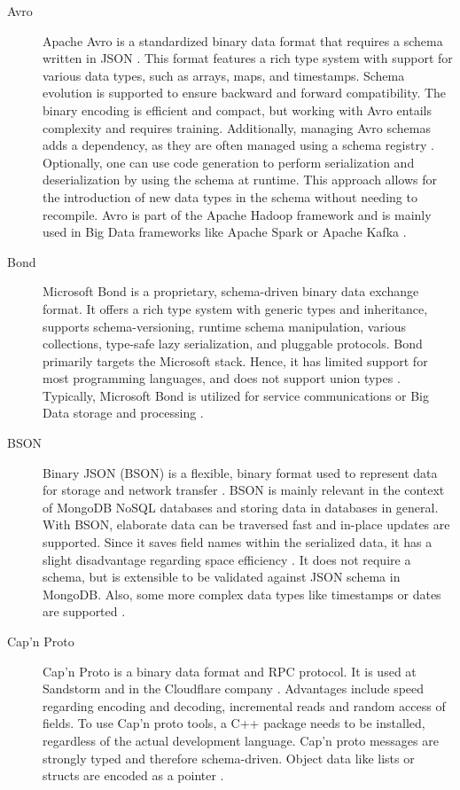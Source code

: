 \documentclass[10pt]{IEEEtran}
\begin{document}
\begin{description}
    \item[Avro]  Apache Avro is a standardized binary data format that requires a schema written in JSON \cite{kaur_2020}. This format features a rich type system with support for various data types, such as arrays, maps, and timestamps. Schema evolution is supported to ensure backward and forward compatibility. The binary encoding is efficient and compact, but working with Avro entails complexity and requires training. Additionally, managing Avro schemas adds a dependency, as they are often managed using a schema registry \cite{klimenko_2024}. Optionally, one can use code generation to perform serialization and deserialization by using the schema at runtime. This approach allows for the introduction of new data types in the schema without needing to recompile. Avro is part of the Apache Hadoop framework and is mainly used in Big Data frameworks like Apache Spark or Apache Kafka \cite{viotti_2022}.
    \item[Bond]  Microsoft Bond is a proprietary, schema-driven binary data exchange format. It offers a rich type system with generic types and inheritance, supports schema-versioning, runtime schema manipulation, various collections, type-safe lazy serialization, and pluggable protocols. Bond primarily targets the Microsoft stack. Hence, it has limited support for most programming languages, and does not support union types \cite{viotti_2022}. Typically, Microsoft Bond is utilized for service communications or Big Data storage and processing \cite{microsoft_2024}.
    \item[BSON]  Binary JSON (BSON) is a flexible, binary format used to represent data for storage and network transfer \cite{kaur_2020}. BSON is mainly relevant in the context of MongoDB NoSQL databases and storing data in databases in general. With BSON, elaborate data can be traversed fast and in-place updates are supported. Since it saves field names within the serialized data, it has a slight disadvantage regarding space efficiency \cite{viotti_2022}. It does not require a schema, but is extensible to be validated against JSON schema in MongoDB. Also, some more complex data types like timestamps or dates are supported \cite{mongodb_2024}.
    \item[Cap'n Proto]  Cap'n Proto is a binary data format and RPC protocol. It is used at Sandstorm and in the Cloudflare company \cite{viotti_2022}. Advantages include speed regarding encoding and decoding, incremental reads and random access of fields. To use Cap'n proto tools, a C++ package needs to be installed, regardless of the actual development language. Cap'n proto messages are strongly typed and therefore schema-driven. Object data like lists or structs are encoded as a pointer \cite{kenton_nodate}.

\end{description}
\end{document}
